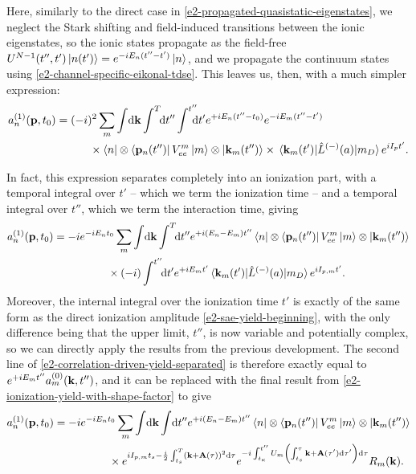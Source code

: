 Here, similarly to the direct case in \eqref{e2-propagated-quasistatic-eigenstates}, we neglect the Stark shifting and field-induced transitions between the ionic eigenstates, so the ionic states propagate as the field-free $U^{N-1}(t'',t')\ket{n(t')}=e^{-iE_n(t''-t')}\ket{n}$, and we propagate the continuum states using \eqref{e2-channel-specific-eikonal-tdse}. This leaves us, then, with a much simpler expression:
\begin{align}
a_n^{(1)}(\vb{p},\tn)
& =
(-i)^2\sum_m  \int\!\d\vb{k}\int^T\!\!\d t''\int^{t''}\!\!\!\!\d t'
e^{+iE_n(t''-\tn)}
e^{-iE_m(t''-t')}
\nonumber \\ & \qquad \quad
\times
\bra{n} \otimes \bra{\vb{p}_n(t'')}
V_{ee}^m
\ket{m}
\otimes 
\ket{\vb{k}_m(t'')}
\times\matrixel{\vb{k}_m(t')}{\hat{L}^{(-)}(a)}{m_D}e^{iI_p t'}.
\label{e2-correlation-driven-yield-second}
\end{align}

In fact, this expression separates completely into an ionization part, with a temporal integral over $t'$ -- which we term the ionization time -- and a temporal integral over $t''$, which we term the interaction time, giving
\begin{align}
a_n^{(1)}(\vb{p},\tn)
& =
-i 
e^{-iE_n \tn}
\sum_m  \int\!\d\vb{k}   \int^T\!\!\d t''
e^{+i(E_n-E_m)t''}
\bra{n} \otimes \bra{\vb{p}_n(t'')}
V_{ee}^m
\ket{m}
\otimes 
\ket{\vb{k}_m(t'')}
\nonumber \\ & \qquad \qquad \quad  \times
(-i)\int^{t''}\!\!\d t'
e^{+iE_m t'}
\matrixel{\vb{k}_m(t')}{\hat{L}^{(-)}(a)}{m_D}e^{iI_{p,m} t'}.
\label{e2-correlation-driven-yield-separated}
\end{align}
Moreover, the internal integral over the ionization time $t'$ is exactly of the same form as the direct ionization amplitude \eqref{e2-sae-yield-beginning}, with the only difference being that the upper limit, $t''$, is now variable and potentially complex, so we can directly apply the results from the previous development. The second line of \eqref{e2-correlation-driven-yield-separated} is therefore exactly equal to $e^{+iE_mt''}a_m^{(0)}(\vb{k},t'')$, and it can be replaced with the final result from \eqref{e2-ionization-yield-with-shape-factor} to give
\begin{align}
a_n^{(1)}(\vb{p},{t_0})
& =
-i 
e^{-iE_n {t_0}}
\sum_m  \int\!\mathrm{d}\vb{k}   \int\!\mathrm{d} t''
e^{+i(E_n-E_m)t''}
\bra{n} \otimes \bra{\vb{p}_n(t'')}
V_{ee}^m
\ket{m}
\otimes 
\ket{\vb{k}_m(t'')}
\nonumber \\ & \qquad \qquad \quad  \times
e^{iI_{p,m} {t_s} - \frac{i}{2} \int_{{t_s}}^{T}\left(\vb{k}+\vb{A}(\tau)\right)^2\mathrm{d}\tau }
e^{-i\int_{t_\kappa}^{t''} U_m\left(\int_{ {t_s}}^\tau \vb{k}+\vb{A}(\tau')\mathrm{d}\tau'\right) \mathrm{d}\tau}
R_m(\vb{k})
.
\label{e2-correlation-driven-yield-with-a1-included}
\end{align}

